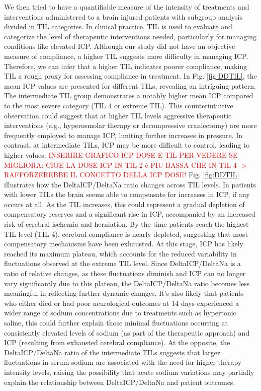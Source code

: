 We then tried to have a quantifiable measure of the intensity of treatments and interventions administered to a brain injured patients with subgroup analysis divided in TIL categories.  In clinical practice, TIL is used to evaluate and categorize the level of therapeutic interventions needed, particularly for managing conditions like elevated ICP. Although our study did not have an objective measure of compliance, a higher TIL suggests more difficulty in managing ICP. Therefore, we can infer that a higher TIL indicates poorer compliance, making TIL a rough proxy for assessing compliance in treatment.
In Fig. \ref{fig:DDTIL}, the mean ICP values are presented for different TILs, revealing an intriguing pattern. The intermediate TIL group demonstrates a notably higher mean ICP compared to the most severe category (TIL 4 or extreme TIL). This counterintuitive observation could suggest that at higher TIL levels aggressive therapeutic interventions (e.g., hyperosmolar therapy or decompressive craniectomy) are more frequently employed to manage ICP,  limiting further increases in pressure. In contrast, at intermediate TILs, ICP may be more difficult to control, leading to higher values. 
\textcolor{red}{INSERIRE GRAFICO ICP DOSE E TIL PER VEDERE SE MIGLIORA: CIOE LA DOSE ICP IN TIL 2 è PIU BASSA CHE IN TIL 4 -> RAFFORZEREBBE IL CONCETTO DELLA ICP DOSE!}
Fig. \ref{fig:DDTIL} illustrates how the DeltaICP/DeltaNa ratio changes across TIL levels. In patients with lower TILs the brain seems able to compensate for increases in ICP, if any occurs at all. As the TIL increases, this could represent a gradual depletion of compensatory reserves and a significant rise in ICP, accompanied by an increased risk of cerebral ischemia and herniation. By the time patients reach the highest TIL level (TIL 4), cerebral compliance is nearly depleted, suggesting that most compensatory mechanisms have been exhausted. At this stage, ICP has likely reached its maximum plateau, which accounts for the reduced variability in fluctuations observed at the extreme TIL level. Since DeltaICP/DeltaNa is a ratio of relative changes, as these fluctuations diminish and ICP can no longer vary significantly due to this plateau, the DeltaICP/DeltaNa ratio becomes less meaningful in reflecting further dynamic changes. It’s also likely that patients who either died or had poor neurological outcomes at 14 days experienced a wider range of sodium concentrations due to treatments such as hypertonic saline, this could further explain those minimal fluctuations occurring at consistently elevated levels of sodium (as part of the therapeutic approach) and ICP (resulting from exhausted cerebral compliance).
At the opposite, the DeltaICP/DeltaNa ratio of the intermediate TILs suggests that larger fluctuations in serum sodium are associated with the need for higher therapy intensity levels, raising the possibility that acute sodium variations may partially explain the relationship between DeltaICP/DeltaNa and patient outcomes.\\

